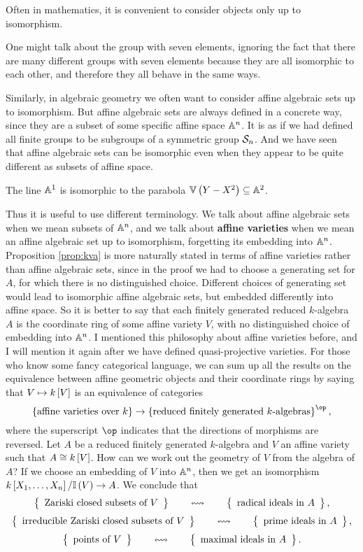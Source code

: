 Often in mathematics, it is convenient to consider objects only up to isomorphism.

\begin{example*}
One might talk about the group with seven elements, ignoring the fact that there are many different groups with seven elements because they are all isomorphic to each other, and therefore they all behave in the same ways.
\end{example*}

Similarly, in algebraic geometry we often want to consider affine algebraic sets up to isomorphism. But affine algebraic sets are always defined in a concrete way, since they are a subset of some specific affine space $ \AA^n $. It is as if we had defined all finite groups to be subgroups of a symmetric group $ \SSS_n $. And we have seen that affine algebraic sets can be isomorphic even when they appear to be quite different as subsets of affine space.

\begin{example*}
The line $ \AA^1 $ is isomorphic to the parabola $ \VV\br{Y - X^2} \subseteq \AA^2 $.
\end{example*}

Thus it is useful to use different terminology. We talk about affine algebraic sets when we mean subsets of $ \AA^n $, and we talk about \textbf{affine varieties} when we mean an affine algebraic set up to isomorphism, forgetting its embedding into $ \AA^n $. Proposition \ref{prop:kva} is more naturally stated in terms of affine varieties rather than affine algebraic sets, since in the proof we had to choose a generating set for $ A $, for which there is no distinguished choice. Different choices of generating set would lead to isomorphic affine algebraic sets, but embedded differently into affine space. So it is better to say that each finitely generated reduced $ k $-algebra $ A $ is the coordinate ring of some affine variety $ V $, with no distinguished choice of embedding into $ \AA^n $. I mentioned this philosophy about affine varieties before, and I will mention it again after we have defined quasi-projective varieties. For those who know some fancy categorical language, we can sum up all the results on the equivalence between affine geometric objects and their coordinate rings by saying that $ V \mapsto k\sbr{V} $ is an equivalence of categories
$$ \cbr{\text{affine varieties over} \ k} \to \cbr{\text{reduced finitely generated $ k $-algebras}}^{\op}, $$
where the superscript $ \op $ indicates that the directions of morphisms are reversed. Let $ A $ be a reduced finitely generated $ k $-algebra and $ V $ an affine variety such that $ A \cong k\sbr{V} $. How can we work out the geometry of $ V $ from the algebra of $ A $? If we choose an embedding of $ V $ into $ \AA^n $, then we get an isomorphism $ k\sbr{X_1, \dots, X_n} / \II\br{V} \to A $. We conclude that
$$ \correspondence{\text{Zariski closed subsets of} \ V}{\text{radical ideals in} \ A}, $$
$$ \correspondence{\text{irreducible Zariski closed subsets of} \ V}{\text{prime ideals in} \ A}, $$
$$ \correspondence{\text{points of} \ V}{\text{maximal ideals in} \ A}. $$

